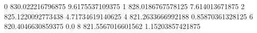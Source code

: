 0 830.022216796875 9.6175537109375
1 828.0186767578125 7.614013671875
2 825.1220092773438 4.71734619140625
4 821.2633666992188 0.85870361328125
6 820.4046630859375 0.0
8 821.5567016601562 1.15203857421875
